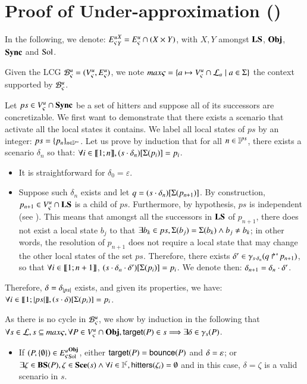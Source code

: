 \section{Proof of Under-approximation ()}
\label{suppl:demoapproxinf}

In the following, we denote:
${E_\varsigma^u}^{X}_{Y} = {E_\varsigma^u} \cap (X \times Y)$, with $X, Y$
amongst $\mathbf{LS}$, $\mathbf{Obj}$, $\mathbf{Sync}$ and $\mathrm{Sol}$.

\begin{proofapproxinf}
Given the LCG ${\mathcal{B}_{\varsigma}^{u}}=(V_\varsigma^u,E_\varsigma^u)$,
we note $max\varsigma = \{a\mapsto V_\varsigma^u\cap\mathcal{L}_a \mid a\in\Sigma\}$ the context supported by ${\mathcal{B}_{\varsigma}^{u}}$.

Let $ps \in {V_\varsigma^u} \cap \mathbf{Sync}$ be a set of hitters
and suppose all of its successors are concretizable.
We first want to demonstrate that
there exists a scenario that activate all the local states it contains.
We label all local states of $ps$ by an integer: $ps = \{ p_n \}_{n \in \mathbb{I}^{ps}}$.
Let us prove by induction that for all $n \in \mathbb{I}^{ps}$, there exists a scenario $\delta_n$ so that:
$\forall i \in \llbracket 1; n \rrbracket, {(s \cdot \delta_n)[\Sigma(p_i)]} = p_i$.
\begin{itemize}
  \item It is straightforward for $\delta_0 = \varepsilon$.
  \item Suppose such $\delta_n$ exists and let $q = {(s \cdot \delta_n)[\Sigma(p_{n+1})]}$.
    By construction, $p_{n+1} \in {V_\varsigma^u} \cap \mathbf{LS}$ is a child of $ps$.
    Furthermore, by hypothesis, $ps$ is independent (see ).
    This means that amongst all the successors in $\mathbf{LS}$ of $p_{n+1}$,
    there does not exist a local state $b_j$ to that
    $\exists b_k \in ps, \Sigma(b_j) = \Sigma(b_k) \wedge b_j \neq b_k$;
    in other words, the resolution of $p_{n+1}$ does not require a local state
    that may change the other local states of the set $ps$.
    Therefore, there exists $\delta' \in \gamma_{s \cdot \delta_n}(\mbox{$q\Rsh^*\!p_{n+1}$})$,
    so that $\forall i \in \llbracket 1; n+1 \rrbracket$, ${(s \cdot \delta_n \cdot \delta')[\Sigma(p_{i})]} = p_{i}$.
    We denote then: $\delta_{n+1} = \delta_n \cdot \delta'$.
\end{itemize}
Therefore, $\delta = \delta_{|ps|}$ exists, and given its properties, we have:
$\forall i \in \llbracket 1; |ps| \rrbracket, {(s \cdot \delta)[\Sigma(p_{i})]} = p_{i}$.

As there is no cycle in ${\mathcal{B}_{\varsigma}^{u}}$, we show by induction in the following that
$\forall s\in \mathcal{L}, s\subseteq max\varsigma, \forall P \in {V_\varsigma^u} \cap \mathbf{Obj},
\mathsf{target}(P) \in s \Longrightarrow \exists \delta \in \gamma_s(P)$.
\begin{itemize}
  \item If $(P, \{ \emptyset \}) \in {E_\varsigma^u}^{\mathbf{Obj}}_{\mathrm{Sol}}$,
    either $\mathsf{target}(P) = \mathsf{bounce}(P)$ and $\delta = \varepsilon$;
    or $\exists \zeta \in \mathbf{BS}(P), \zeta \in \mathbf{Sce}(s) \wedge
      \forall i \in \mathbb{I}^{\zeta}, \mathsf{hitters}(\zeta_i) = \emptyset$
    and in this case, $\delta = \zeta$ is a valid scenario in $s$.


\end{itemize}
\end{proofapproxinf}
